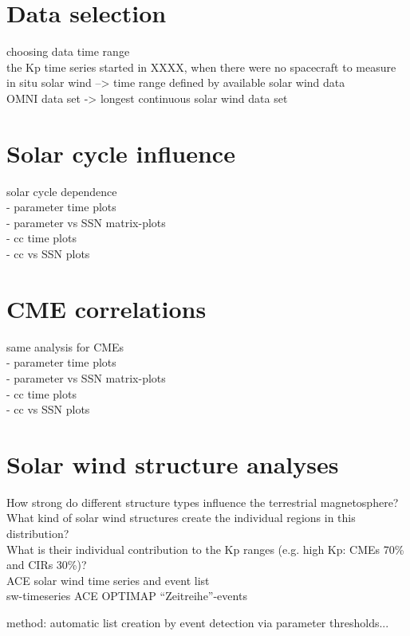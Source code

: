 \section{Data selection}
choosing data time range\\
the Kp time series started in XXXX, when there were no spacecraft to measure in situ solar wind --> time range defined by available solar wind data\\
OMNI data set -> longest continuous solar wind data set\\

\section{Solar cycle influence}
solar cycle dependence\\
- parameter time plots\\
- parameter vs SSN matrix-plots\\
- cc time plots\\
- cc vs SSN plots\\

\section{CME correlations}
same analysis for CMEs\\
- parameter time plots\\
- parameter vs SSN matrix-plots\\
- cc time plots\\
- cc vs SSN plots\\

\section{Solar wind structure analyses}

How strong do different structure types influence the terrestrial magnetosphere?\\
What kind of solar wind structures create the individual regions in this distribution?\\
What is their individual contribution to the Kp ranges (e.g. high Kp: CMEs 70\% and CIRs 30\%)?\\

ACE solar wind time series and event list\\
sw-timeseries ACE OPTIMAP ``Zeitreihe''-events

method: automatic list creation by event detection via parameter thresholds...\\

